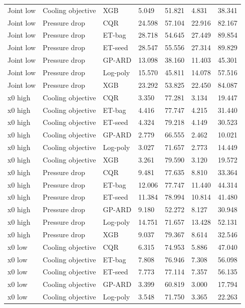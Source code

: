 \begin{longtable}{lllllll}
Joint low & Cooling objective & XGB & 5.049 & 51.821 & 4.831 & 38.341\\
Joint low & Pressure drop & CQR & 24.598 & 57.104 & 22.916 & 82.167\\
Joint low & Pressure drop & ET-bag & 28.718 & 54.645 & 27.449 & 89.854\\
Joint low & Pressure drop & ET-seed & 28.547 & 55.556 & 27.314 & 89.829\\
Joint low & Pressure drop & GP-ARD & 13.098 & 38.160 & 11.403 & 45.301\\
Joint low & Pressure drop & Log-poly & 15.570 & 45.811 & 14.078 & 57.516\\
Joint low & Pressure drop & XGB & 23.292 & 53.825 & 22.450 & 84.087\\
x0 high & Cooling objective & CQR & 3.350 & 77.281 & 3.134 & 19.447\\
x0 high & Cooling objective & ET-bag & 4.416 & 77.747 & 4.215 & 31.440\\
x0 high & Cooling objective & ET-seed & 4.324 & 79.218 & 4.149 & 30.523\\
x0 high & Cooling objective & GP-ARD & 2.779 & 66.555 & 2.462 & 10.021\\
x0 high & Cooling objective & Log-poly & 3.027 & 71.657 & 2.773 & 14.449\\
x0 high & Cooling objective & XGB & 3.261 & 79.590 & 3.120 & 19.572\\
x0 high & Pressure drop & CQR & 9.481 & 77.635 & 8.810 & 33.364\\
x0 high & Pressure drop & ET-bag & 12.006 & 77.747 & 11.440 & 44.314\\
x0 high & Pressure drop & ET-seed & 11.384 & 78.994 & 10.814 & 41.480\\
x0 high & Pressure drop & GP-ARD & 9.180 & 52.272 & 8.127 & 30.948\\
x0 high & Pressure drop & Log-poly & 14.751 & 71.657 & 13.428 & 52.131\\
x0 high & Pressure drop & XGB & 9.037 & 79.367 & 8.614 & 32.546\\
x0 low & Cooling objective & CQR & 6.315 & 74.953 & 5.886 & 47.040\\
x0 low & Cooling objective & ET-bag & 7.808 & 76.946 & 7.308 & 56.098\\
x0 low & Cooling objective & ET-seed & 7.773 & 77.114 & 7.357 & 56.135\\
x0 low & Cooling objective & GP-ARD & 3.399 & 60.819 & 3.000 & 17.794\\
x0 low & Cooling objective & Log-poly & 3.548 & 71.750 & 3.365 & 22.263\\

\end{longtable}
